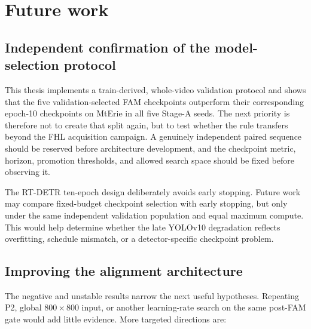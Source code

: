 \section{Future work}

\subsection{Independent confirmation of the model-selection protocol}

This thesis implements a train-derived, whole-video validation protocol and
shows that the five validation-selected FAM checkpoints outperform their
corresponding epoch-10 checkpoints on MtErie in all five Stage-A seeds. The
next priority is therefore not to create that split again, but to test
whether the rule transfers beyond the FHL acquisition campaign. A genuinely
independent paired sequence should be reserved before architecture development,
and the checkpoint metric, horizon, promotion thresholds, and allowed search
space should be fixed before observing it.

The RT-DETR ten-epoch design deliberately avoids early stopping. Future work
may compare fixed-budget checkpoint selection with early stopping, but only
under the same independent validation population and equal maximum compute.
This would help determine whether the late YOLOv10 degradation reflects
overfitting, schedule mismatch, or a detector-specific checkpoint problem.

\subsection{Improving the alignment architecture}

The negative and unstable results narrow the next useful hypotheses. Repeating
P2, global \(800\times800\) input, or another learning-rate search on the same
post-FAM gate would add little evidence. More targeted directions are:

